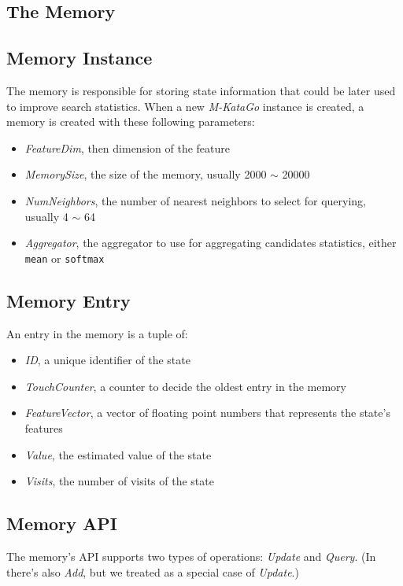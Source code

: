 \documentclass{article}
\newcommand{\mkatago}{\emph{M-KataGo}\xspace}
\begin{document}
      \subsection{The Memory}
      \subsection{Memory Instance}
      The memory is responsible for storing state information that could be later used to improve search statistics.
      When a new \mkatago instance is created, a memory is created with these following parameters:
      \begin{itemize}
            \item \textit{FeatureDim}, then dimension of the feature
            \item \textit{MemorySize}, the size of the memory, usually 2000 $\sim$ 20000
            \item \textit{NumNeighbors}, the number of nearest neighbors to select for querying, usually 4 $\sim$ 64
            \item \textit{Aggregator}, the aggregator to use for aggregating candidates statistics, either \texttt{mean} or \texttt{softmax}
      \end{itemize}

      \subsection{Memory Entry}
      An entry in the memory is a tuple of:
      \begin{itemize}
            \item \textit{ID}, a unique identifier of the state
            \item \textit{TouchCounter}, a counter to decide the oldest entry in the memory
            \item \textit{FeatureVector}, a vector of floating point numbers that represents the state's features
            \item \textit{Value}, the estimated value of the state
            \item \textit{Visits}, the number of visits of the state
      \end{itemize}

      \subsection{Memory API}
      The memory's API supports two types of operations: \textit{Update} and \textit{Query}.
      (In \cite{xiao_memory-augmented_2018} there's also \textit{Add}, but we treated as a special case of \textit{Update}.)
\end{document}
